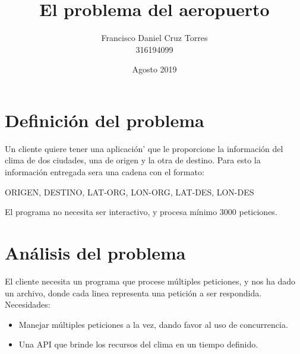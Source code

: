 \documentclass{report}
\title{El problema del aeropuerto}
\author{Francisco Daniel Cruz Torres \\ 316194099}
\date{Agosto 2019}
\begin{document}
\maketitle

\section{Definición del problema}
Un cliente quiere tener una aplicación' que le proporcione la información del clima de dos ciudades, una de origen y la otra de destino.
Para esto la información entregada sera una cadena con el formato: \begin{center}
ORIGEN, DESTINO, LAT-ORG, LON-ORG, LAT-DES, LON-DES
\end{center}
El programa no necesita ser interactivo, y procesa mínimo 3000 peticiones.

\section{Análisis del problema}
El cliente necesita un programa que procese múltiples peticiones, y nos ha dado un archivo, donde cada linea representa una petición a ser respondida. \\
Necesidades:
\begin{itemize}
\item Manejar múltiples peticiones a la vez, dando favor al uso de concurrencia.
\item Una API que brinde los recursos del clima en un tiempo definido.
\end{itemize}
\end{document}
